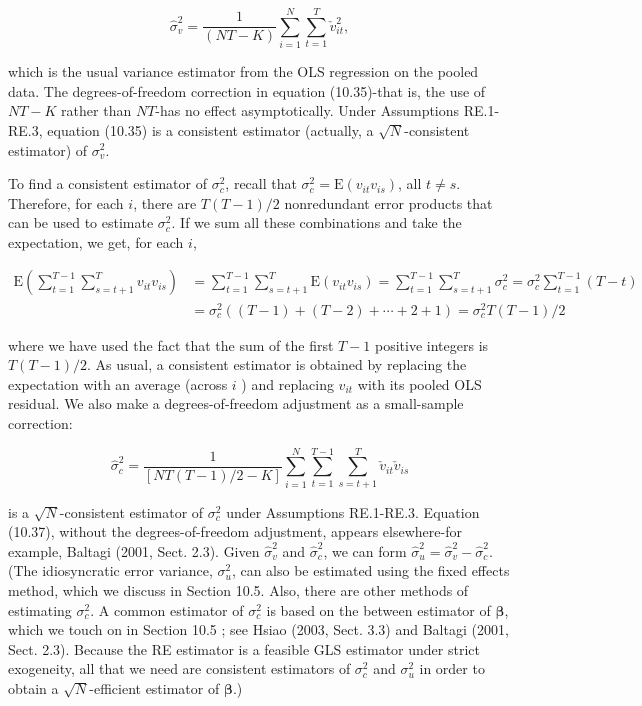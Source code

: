 \documentclass[10pt]{article}
\begin{document}
\begin{equation*}
\hat{\sigma}_{v}^{2}=\frac{1}{(N T-K)} \sum_{i=1}^{N} \sum_{t=1}^{T} \check{v}_{i t}^{2}, \tag{10.35}
\end{equation*}


which is the usual variance estimator from the OLS regression on the pooled data. The degrees-of-freedom correction in equation (10.35)-that is, the use of $N T-K$ rather than $N T$-has no effect asymptotically. Under Assumptions RE.1-RE.3, equation (10.35) is a consistent estimator (actually, a $\sqrt{N}$-consistent estimator) of $\sigma_{v}^{2}$.

To find a consistent estimator of $\sigma_{c}^{2}$, recall that $\sigma_{c}^{2}=\mathrm{E}\left(v_{i t} v_{i s}\right)$, all $t \neq s$. Therefore, for each $i$, there are $T(T-1) / 2$ nonredundant error products that can be used to estimate $\sigma_{c}^{2}$. If we sum all these combinations and take the expectation, we get, for each $i$,


\begin{align*}
\mathrm{E}\left(\sum_{t=1}^{T-1} \sum_{s=t+1}^{T} v_{i t} v_{i s}\right) & =\sum_{t=1}^{T-1} \sum_{s=t+1}^{T} \mathrm{E}\left(v_{i t} v_{i s}\right)=\sum_{t=1}^{T-1} \sum_{s=t+1}^{T} \sigma_{c}^{2}=\sigma_{c}^{2} \sum_{t=1}^{T-1}(T-t) \\
& =\sigma_{c}^{2}((T-1)+(T-2)+\cdots+2+1)=\sigma_{c}^{2} T(T-1) / 2 \tag{10.36}
\end{align*}


where we have used the fact that the sum of the first $T-1$ positive integers is $T(T-1) / 2$. As usual, a consistent estimator is obtained by replacing the expectation with an average (across $i$ ) and replacing $v_{i t}$ with its pooled OLS residual. We also make a degrees-of-freedom adjustment as a small-sample correction:


\begin{equation*}
\hat{\sigma}_{c}^{2}=\frac{1}{[N T(T-1) / 2-K]} \sum_{i=1}^{N} \sum_{t=1}^{T-1} \sum_{s=t+1}^{T} \check{v}_{i t} \check{v}_{i s} \tag{10.37}
\end{equation*}


is a $\sqrt{N}$-consistent estimator of $\sigma_{c}^{2}$ under Assumptions RE.1-RE.3. Equation (10.37), without the degrees-of-freedom adjustment, appears elsewhere-for example, Baltagi (2001, Sect. 2.3). Given $\hat{\sigma}_{v}^{2}$ and $\hat{\sigma}_{c}^{2}$, we can form $\hat{\sigma}_{u}^{2}=\hat{\sigma}_{v}^{2}-\hat{\sigma}_{c}^{2}$. (The idiosyncratic error variance, $\sigma_{u}^{2}$, can also be estimated using the fixed effects method, which we discuss in Section 10.5. Also, there are other methods of estimating $\sigma_{c}^{2}$. A common estimator of $\sigma_{c}^{2}$ is based on the between estimator of $\boldsymbol{\beta}$, which we touch on in Section 10.5 ; see Hsiao (2003, Sect. 3.3) and Baltagi (2001, Sect. 2.3). Because the RE estimator is a feasible GLS estimator under strict exogeneity, all that we need are consistent estimators of $\sigma_{c}^{2}$ and $\sigma_{u}^{2}$ in order to obtain a $\sqrt{N}$-efficient estimator of $\boldsymbol{\beta}$.)
\end{document}

